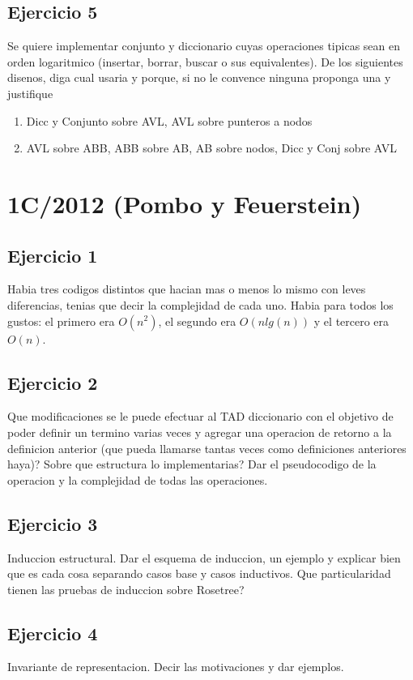 \documentclass[10pt, a4paper]{article}
\begin{document}
\subsection*{Ejercicio 5}

Se quiere implementar conjunto y diccionario cuyas operaciones tipicas sean en orden logaritmico (insertar, borrar, buscar o sus equivalentes). De los siguientes disenos, diga cual usaria y porque, si no le convence ninguna proponga una y justifique
\begin{enumerate}
 \item Dicc y Conjunto sobre AVL, AVL sobre punteros a nodos
 \item AVL sobre ABB, ABB sobre AB, AB sobre nodos, Dicc y Conj sobre AVL
\end{enumerate}

\newpage
\section{1C/2012 (Pombo y Feuerstein)}

\subsection*{Ejercicio 1}
Habia tres codigos distintos que hacian mas o menos lo mismo con leves diferencias, tenias que decir la complejidad de cada uno. Habia para todos los gustos: el primero era $O(n^2)$, el segundo era $O(nlg(n))$ y el tercero era $O(n)$.

\subsection*{Ejercicio 2}
Que modificaciones se le puede efectuar al TAD diccionario con el objetivo de poder definir un termino varias veces y agregar una operacion de retorno a la definicion anterior (que pueda llamarse tantas veces como definiciones anteriores haya)? Sobre que estructura lo implementarias? Dar el pseudocodigo de la operacion y la complejidad de todas las operaciones.

\subsection*{Ejercicio 3}
Induccion estructural. Dar el esquema de induccion, un ejemplo y explicar bien que es cada cosa separando casos base y casos inductivos. Que particularidad tienen las pruebas de induccion sobre Rosetree?

\subsection*{Ejercicio 4}
Invariante de representacion. Decir las motivaciones y dar ejemplos.
\end{document}

